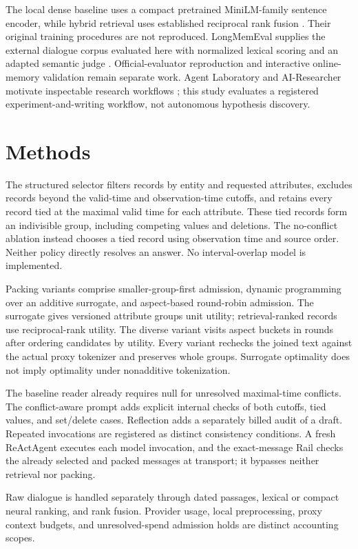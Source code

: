 \documentclass{article}
\begin{document}
The local dense baseline uses a compact pretrained MiniLM-family sentence encoder, while hybrid retrieval uses established reciprocal rank fusion \citep{minilm,rrf}. Their original training procedures are not reproduced. LongMemEval supplies the external dialogue corpus evaluated here with normalized lexical scoring and an adapted semantic judge \citep{longmemeval}. Official-evaluator reproduction and interactive online-memory validation remain separate work. Agent Laboratory and AI-Researcher motivate inspectable research workflows \citep{agentlab,airesearcher}; this study evaluates a registered experiment-and-writing workflow, not autonomous hypothesis discovery.
\section{Methods}
The structured selector filters records by entity and requested attributes, excludes records beyond the valid-time and observation-time cutoffs, and retains every record tied at the maximal valid time for each attribute. These tied records form an indivisible group, including competing values and deletions. The no-conflict ablation instead chooses a tied record using observation time and source order. Neither policy directly resolves an answer. No interval-overlap model is implemented.

Packing variants comprise smaller-group-first admission, dynamic programming over an additive surrogate, and aspect-based round-robin admission. The surrogate gives versioned attribute groups unit utility; retrieval-ranked records use reciprocal-rank utility. The diverse variant visits aspect buckets in rounds after ordering candidates by utility. Every variant rechecks the joined text against the actual proxy tokenizer and preserves whole groups. Surrogate optimality does not imply optimality under nonadditive tokenization.

The baseline reader already requires null for unresolved maximal-time conflicts. The conflict-aware prompt adds explicit internal checks of both cutoffs, tied values, and set/delete cases. Reflection adds a separately billed audit of a draft. Repeated invocations are registered as distinct consistency conditions. A fresh ReActAgent executes each model invocation, and the exact-message Rail checks the already selected and packed messages at transport; it bypasses neither retrieval nor packing.

Raw dialogue is handled separately through dated passages, lexical or compact neural ranking, and rank fusion. Provider usage, local preprocessing, proxy context budgets, and unresolved-spend admission holds are distinct accounting scopes.
\end{document}
